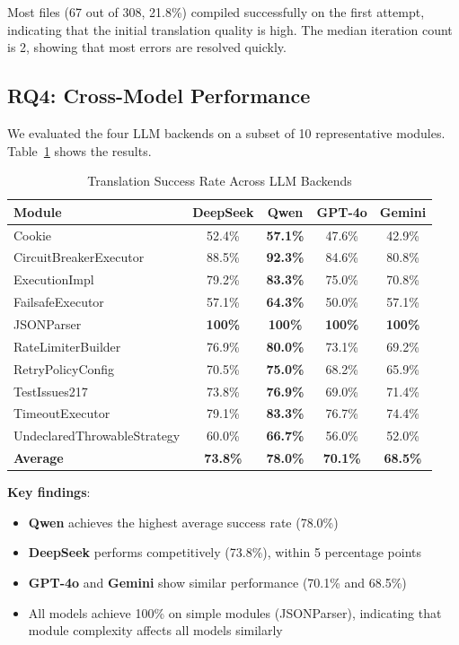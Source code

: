 Most files (67 out of 308, 21.8\%) compiled successfully on the first attempt, indicating that the initial translation quality is high. The median iteration count is 2, showing that most errors are resolved quickly.

\subsection{RQ4: Cross-Model Performance}

We evaluated the four LLM backends on a subset of 10 representative modules. Table~\ref{tab:model-comparison} shows the results.

\begin{table}[h]
\centering
\caption{Translation Success Rate Across LLM Backends}
\label{tab:model-comparison}
\begin{tabular}{lcccc}
\toprule
\textbf{Module} & \textbf{DeepSeek} & \textbf{Qwen} & \textbf{GPT-4o} & \textbf{Gemini} \\
\midrule
Cookie & 52.4\% & \textbf{57.1\%} & 47.6\% & 42.9\% \\
CircuitBreakerExecutor & 88.5\% & \textbf{92.3\%} & 84.6\% & 80.8\% \\
ExecutionImpl & 79.2\% & \textbf{83.3\%} & 75.0\% & 70.8\% \\
FailsafeExecutor & 57.1\% & \textbf{64.3\%} & 50.0\% & 57.1\% \\
JSONParser & \textbf{100\%} & \textbf{100\%} & \textbf{100\%} & \textbf{100\%} \\
RateLimiterBuilder & 76.9\% & \textbf{80.0\%} & 73.1\% & 69.2\% \\
RetryPolicyConfig & 70.5\% & \textbf{75.0\%} & 68.2\% & 65.9\% \\
TestIssues217 & 73.8\% & \textbf{76.9\%} & 69.0\% & 71.4\% \\
TimeoutExecutor & 79.1\% & \textbf{83.3\%} & 76.7\% & 74.4\% \\
UndeclaredThrowableStrategy & 60.0\% & \textbf{66.7\%} & 56.0\% & 52.0\% \\
\midrule
\textbf{Average} & \textbf{73.8\%} & \textbf{78.0\%} & \textbf{70.1\%} & \textbf{68.5\%} \\
\bottomrule
\end{tabular}
\end{table}

\textbf{Key findings}:
\begin{itemize}
\item \textbf{Qwen} achieves the highest average success rate (78.0\%)
\item \textbf{DeepSeek} performs competitively (73.8\%), within 5 percentage points
\item \textbf{GPT-4o} and \textbf{Gemini} show similar performance (70.1\% and 68.5\%)
\item All models achieve 100\% on simple modules (JSONParser), indicating that module complexity affects all models similarly
\end{itemize}

